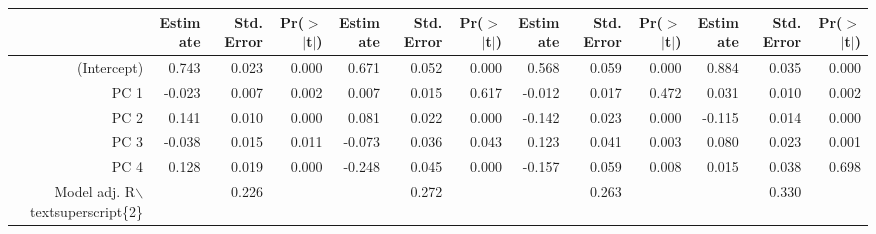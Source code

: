 \begin{table}[ht]
\centering
\begin{tabular}{rrrrrrrrrrrrr}
  \hline
 & Estimate & Std. Error & Pr($>$$|$t$|$) & Estimate & Std. Error & Pr($>$$|$t$|$) & Estimate & Std. Error & Pr($>$$|$t$|$) & Estimate & Std. Error & Pr($>$$|$t$|$) \\ 
  \hline
(Intercept) & 0.743 & 0.023 & 0.000 & 0.671 & 0.052 & 0.000 & 0.568 & 0.059 & 0.000 & 0.884 & 0.035 & 0.000 \\ 
  PC 1 & -0.023 & 0.007 & 0.002 & 0.007 & 0.015 & 0.617 & -0.012 & 0.017 & 0.472 & 0.031 & 0.010 & 0.002 \\ 
  PC 2 & 0.141 & 0.010 & 0.000 & 0.081 & 0.022 & 0.000 & -0.142 & 0.023 & 0.000 & -0.115 & 0.014 & 0.000 \\ 
  PC 3 & -0.038 & 0.015 & 0.011 & -0.073 & 0.036 & 0.043 & 0.123 & 0.041 & 0.003 & 0.080 & 0.023 & 0.001 \\ 
  PC 4 & 0.128 & 0.019 & 0.000 & -0.248 & 0.045 & 0.000 & -0.157 & 0.059 & 0.008 & 0.015 & 0.038 & 0.698 \\ 
  Model adj. R$\backslash$textsuperscript\{2\} &  & 0.226 &  &  & 0.272 &  &  & 0.263 &  &  & 0.330 &  \\ 
   \hline
\end{tabular}
\end{table}
